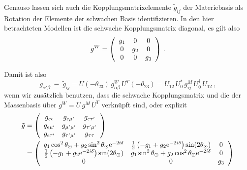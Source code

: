 Genauso lassen sich auch die Kopplungsmatrixelemente $\tilde{g}_{i j}$ der Materiebasis als Rotation der Elemente der schwachen Basis identifizieren.
In den hier betrachteten Modellen ist die schwache Kopplungsmatrix diagonal, es gilt also
\begin{equation}
    g^W = \left( \begin{array}{c c c}
        g_1         &   0     &     0   \\ 
        0           &   g_2   &     0   \\ 
        0           &   0     &     g_3  \\
    \end{array}\right) \,.
    \label{eq:schwachekopplung}
\end{equation}

Damit ist also
\begin{equation}
    g_{\alpha' \beta'} \equiv \ \tilde{g}_{i j} = U(-\theta_{2 3}) \, g^W_{\alpha \beta} \, U^T(-\theta_{2 3}) = U_{1 2} \, U^*_0 \, g^M_{i j} \, U^\dagger_0 \, U_{1 2} \,,
\end{equation}
wenn wir zusätzlich benutzen, dass die schwache Kopplungsmatrix und die der Massenbasis über $g^W = U \, g^M \, U^T$ verknüpft sind, oder explizit
\begin{align}
    \tilde{g} &= \left( \begin{array}{c c c}
        g_{ee}                  &   g_{e \mu'}          &     g_{e \tau'}       \\ 
        g_{e \mu'}              &   g_{\mu' \mu'}       &     g_{\tau' \mu'}    \\ 
        g_{e \tau'}             &   g_{\tau' \mu'}      &     g_{\tau \tau}     \\
    \end{array}\right) \nonumber\\
    &= \left( \begin{array}{c c c}
        g_1 \cos^2 \theta_\odot + g_2 \sin^2 \theta_\odot \mathrm{e}^{-2 i \delta}                   &   \frac{1}{2} \left(-g_1 + g_2 \mathrm{e}^{-2 i \delta}\right) \sin(2 \theta_\odot)       &     0   \\ 
        \frac{1}{2} \left(-g_1 + g_2 \mathrm{e}^{-2 i \delta}\right) \sin(2 \theta_\odot)           &   g_1 \sin^2 \theta_\odot + g_2 \cos^2 \theta_\odot\mathrm{e}^{-2 i \delta}                &     0   \\ 
        0                                                                                           &   0                                                                                       &     g_3  \\
    \end{array}\right)
    \label{eq:materiekoppmat}
\end{align}
